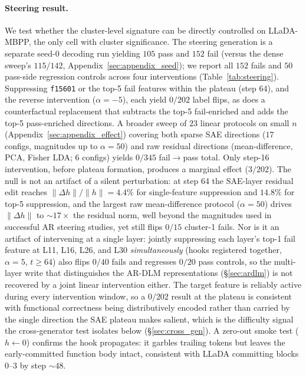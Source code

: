 \documentclass[11pt]{article}
\begin{document}
\paragraph{Steering result.}
\label{sec:steer}
We test whether the cluster-level signature can be directly controlled on LLaDA-MBPP, the only cell with cluster significance.
The steering generation is a separate seed-$0$ decoding run yielding $105$ pass and $152$ fail (versus the dense sweep's $115/142$, Appendix~\ref{sec:appendix_seed}); we report all $152$ fails and $50$ pass-side regression controls across four interventions (Table~\ref{tab:steering}).
Suppressing \texttt{f15601} or the top-5 fail features within the plateau (step 64), and the reverse intervention ($\alpha{=}-5$), each yield $0/202$ label flips, as does a counterfactual replacement that subtracts the top-5 fail-enriched and adds the top-5 pass-enriched directions. A broader sweep of $23$ linear protocols on small $n$ (Appendix~\ref{sec:appendix_effect}) covering both sparse SAE directions ($17$ configs, magnitudes up to $\alpha\!=\!50$) and raw residual directions (mean-difference, PCA, Fisher LDA; $6$ configs) yields $0/345$ fail$\to$pass total. Only step-16 intervention, before plateau formation, produces a marginal effect ($3/202$).
The null is not an artifact of a silent perturbation: at step 64 the SAE-layer residual edit reaches $\|\Delta h\|/\|h\|\!=\!4.4\%$ for single-feature suppression and $14.8\%$ for top-5 suppression, and the largest raw mean-difference protocol ($\alpha\!=\!50$) drives $\|\Delta h\|$ to $\sim$$17\times$ the residual norm, well beyond the magnitudes used in successful AR steering studies, yet still flips $0/15$ cluster-1 fails.
Nor is it an artifact of intervening at a single layer: jointly suppressing each layer's top-1 fail feature at L11, L16, L26, and L30 \emph{simultaneously} (hooks registered together, $\alpha\!=\!5$, $t\!\ge\!64$) also flips $0/40$ fails and regresses $0/20$ pass controls, so the multi-layer write that distinguishes the AR-DLM representations (\S\ref{sec:ardlm}) is not recovered by a joint linear intervention either.
The target feature is reliably active during every intervention window, so a $0/202$ result at the plateau is consistent with functional correctness being distributively encoded rather than carried by the single direction the SAE plateau makes salient, which is the difficulty signal the cross-generator test isolates below (\S\ref{sec:cross_gen}).
A zero-out smoke test ($h{\leftarrow}0$) confirms the hook propagates: it garbles trailing tokens but leaves the early-committed function body intact, consistent with LLaDA committing blocks 0--3 by step $\sim\!48$.
\end{document}
